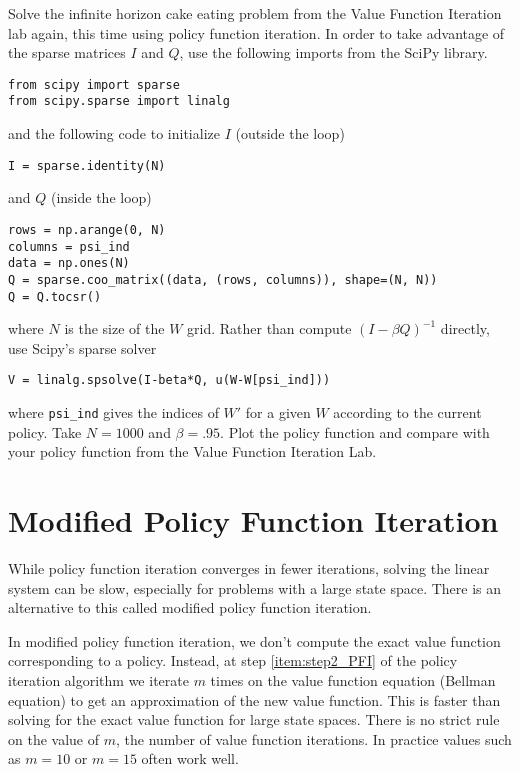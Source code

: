 \begin{problem}
\label{prob:cake_eating_policyfun}
Solve the infinite horizon cake eating problem from the Value Function Iteration lab again, this time using policy function iteration.  In order to take advantage of the sparse matrices $I$ and $Q$, use the following imports from the SciPy  library.
\begin{lstlisting}
from scipy import sparse
from scipy.sparse import linalg
\end{lstlisting}
and the following code to initialize $I$ (outside the loop)
\begin{lstlisting}
I = sparse.identity(N)
\end{lstlisting}
and $Q$ (inside the loop)
\begin{lstlisting}
rows = np.arange(0, N)
columns = psi_ind
data = np.ones(N)
Q = sparse.coo_matrix((data, (rows, columns)), shape=(N, N))
Q = Q.tocsr()
\end{lstlisting}
where $N$ is the size of the $W$ grid.  Rather than compute $(I-\beta Q)^{-1}$ directly, use Scipy's sparse solver
\begin{lstlisting}
V = linalg.spsolve(I-beta*Q, u(W-W[psi_ind]))
\end{lstlisting}
where \texttt{psi\_ind} gives the indices of $W'$ for a given $W$ according to the current policy.  
Take $N = 1000$ and $\beta = .95$.
Plot the policy function and compare with your policy function from the Value Function Iteration Lab.
\end{problem}

\section*{Modified Policy Function Iteration}
While policy function iteration converges in fewer iterations, solving the linear system can be slow, especially for problems with a large state space.  There is an alternative to this called modified policy function iteration.

In modified policy function iteration, we don't compute the exact value function corresponding to a policy.  Instead, at step \ref{item:step2_PFI} of the policy iteration algorithm we iterate $m$ times on the value function equation (Bellman equation) to get an approximation of the new value function.  This is faster than solving for the exact value function for large state spaces.  There is no strict rule on the value of $m$, the number of value function iterations.  In practice values such as $m=10$ or $m=15$ often work well.

